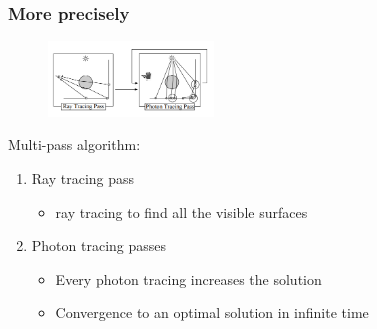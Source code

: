 \documentclass{beamer}
\begin{document}
\begin{frame}
    \frametitle{More precisely}
    \begin{figure}
        \centering
        \includegraphics[height=2cm]{img/PPM}
    \end{figure}
    Multi-pass algorithm:
    \begin{enumerate}
        \item Ray tracing pass
            \begin{itemize}
                \item ray tracing to find all the visible surfaces
            \end{itemize}
        \item Photon tracing passes
            \begin{itemize}
                \item Every photon tracing increases the solution
                \item Convergence to an optimal solution in infinite time
            \end{itemize}
    \end{enumerate}
\end{frame}
\end{document}
